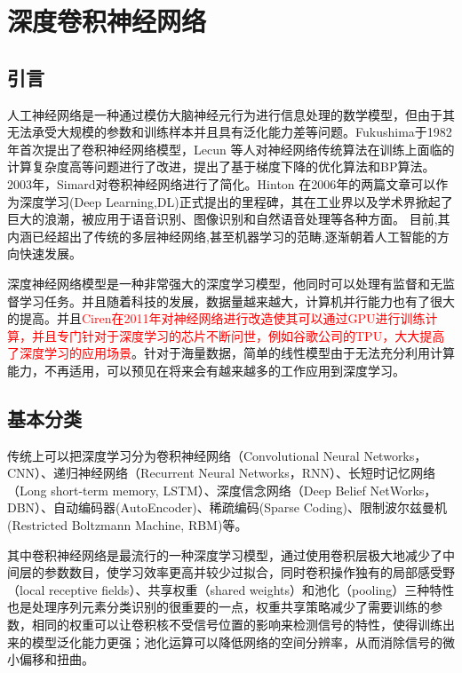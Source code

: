 \chapter{深度卷积神经网络}
\section{引言}
人工神经网络\cite{hebb2005organization}是一种通过模仿大脑神经元行为进行信息处理的数学模型，但由于其无法承受大规模的参数和训练样本并且具有泛化能力差等问题。Fukushima\cite{fukushima1982neocognitron}于1982年首次提出了卷积神经网络模型，Lecun 等人对神经网络传统算法在训练上面临的计算复杂度高等问题进行了改进，提出了基于梯度下降的优化算法\cite{lecun1998gradient}和BP算法\cite{lecun1989backpropagation}。2003年，Simard对卷积神经网络进行了简化\cite{simard2003best}。Hinton 在2006年的两篇文章\cite{hinton2006reducing,hinton2006fast}可以作为深度学习(Deep Learning,DL)正式提出的里程碑，其在工业界以及学术界掀起了巨大的浪潮，被应用于语音识别\cite{hinton2012deep}、图像识别\cite{krizhevsky2012imagenet}和自然语音处理\cite{collobert2011natural}等各种方面。 目前,其内涵已经超出了传统的多层神经网络,甚至机器学习的范畴,逐渐朝着人工智能的方向快速发展\cite{silver2017mastering}。

深度神经网络模型是一种非常强大的深度学习模型，他同时可以处理有监督和无监督学习任务。并且随着科技的发展，数据量越来越大，计算机并行能力也有了很大的提高。并且\textcolor{red}{Ciren在2011年对神经网络进行改造使其可以通过GPU进行训练计算\cite{ciresan2011flexible}，并且专门针对于深度学习的芯片不断问世，例如谷歌公司的TPU\cite{jouppi2017datacenter}，大大提高了深度学习的应用场景}。针对于海量数据，简单的线性模型由于无法充分利用计算能力，不再适用，可以预见在将来会有越来越多的工作应用到深度学习。

\section{基本分类}
传统上可以把深度学习分为卷积神经网络（Convolutional Neural Networks， CNN）、递归神经网络（Recurrent Neural Networks，RNN）、长短时记忆网络（Long short-term memory, LSTM）、深度信念网络（Deep Belief NetWorks，DBN）、自动编码器(AutoEncoder)、稀疏编码(Sparse Coding)、限制波尔兹曼机(Restricted Boltzmann Machine, RBM)等。

其中卷积神经网络是最流行的一种深度学习模型，通过使用卷积层极大地减少了中间层的参数数目，使学习效率更高并较少过拟合，同时卷积操作独有的局部感受野（local receptive fields）、共享权重（shared weights）和池化（pooling）三种特性也是处理序列元素分类识别的很重要的一点，权重共享策略减少了需要训练的参数，相同的权重可以让卷积核不受信号位置的影响来检测信号的特性，使得训练出来的模型泛化能力更强；池化运算可以降低网络的空间分辨率，从而消除信号的微小偏移和扭曲。

